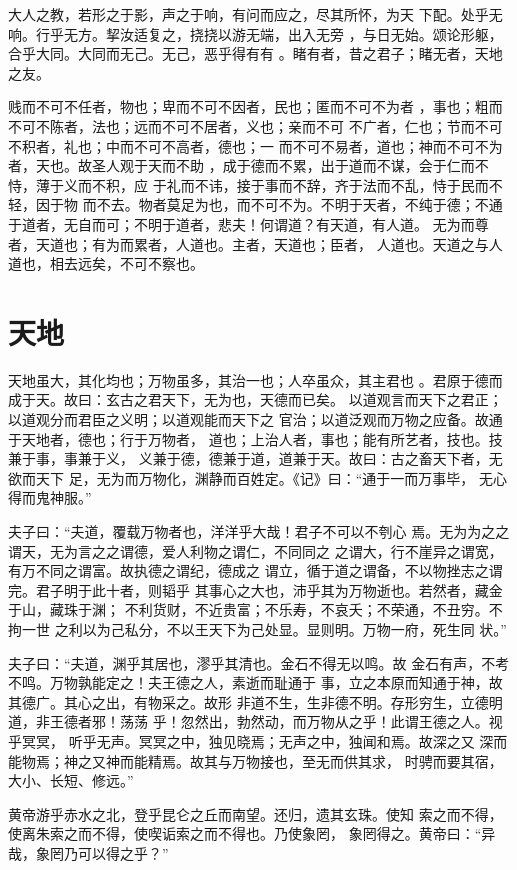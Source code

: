 \documentclass[a4paper,12pt,UTF8,twoside]{ctexbook}
\begin{document}
大人之教，若形之于影，声之于响，有问而应之，尽其所怀，为天 下配。处乎无响。行乎无方。挈汝适复之，挠挠以游无端，出入无旁 ，与日无始。颂论形躯，合乎大同。大同而无己。无己，恶乎得有有 。睹有者，昔之君子；睹无者，天地之友。

贱而不可不任者，物也；卑而不可不因者，民也；匿而不可不为者 ，事也；粗而不可不陈者，法也；远而不可不居者，义也；亲而不可 不广者，仁也；节而不可不积者，礼也；中而不可不高者，德也；一 而不可不易者，道也；神而不可不为者，天也。故圣人观于天而不助 ，成于德而不累，出于道而不谋，会于仁而不恃，薄于义而不积，应 于礼而不讳，接于事而不辞，齐于法而不乱，恃于民而不轻，因于物 而不去。物者莫足为也，而不可不为。不明于天者，不纯于德；不通 于道者，无自而可；不明于道者，悲夫！何谓道？有天道，有人道。 无为而尊者，天道也；有为而累者，人道也。主者，天道也；臣者， 人道也。天道之与人道也，相去远矣，不可不察也。

\section{天地}

天地虽大，其化均也；万物虽多，其治一也；人卒虽众，其主君也 。君原于德而成于天。故曰：玄古之君天下，无为也，天德而已矣。 以道观言而天下之君正；以道观分而君臣之义明；以道观能而天下之 官治；以道泛观而万物之应备。故通于天地者，德也；行于万物者， 道也；上治人者，事也；能有所艺者，技也。技兼于事，事兼于义， 义兼于德，德兼于道，道兼于天。故曰：古之畜天下者，无欲而天下 足，无为而万物化，渊静而百姓定。《记》曰：“通于一而万事毕， 无心得而鬼神服。”

夫子曰：“夫道，覆载万物者也，洋洋乎大哉！君子不可以不刳心 焉。无为为之之谓天，无为言之之谓德，爱人利物之谓仁，不同同之 之谓大，行不崖异之谓宽，有万不同之谓富。故执德之谓纪，德成之 谓立，循于道之谓备，不以物挫志之谓完。君子明于此十者，则韬乎 其事心之大也，沛乎其为万物逝也。若然者，藏金于山，藏珠于渊； 不利货财，不近贵富；不乐寿，不哀夭；不荣通，不丑穷。不拘一世 之利以为己私分，不以王天下为己处显。显则明。万物一府，死生同 状。”

夫子曰：“夫道，渊乎其居也，漻乎其清也。金石不得无以鸣。故 金石有声，不考不鸣。万物孰能定之！夫王德之人，素逝而耻通于 事，立之本原而知通于神，故其德广。其心之出，有物采之。故形 非道不生，生非德不明。存形穷生，立德明道，非王德者邪！荡荡 乎！忽然出，勃然动，而万物从之乎！此谓王德之人。视乎冥冥， 听乎无声。冥冥之中，独见晓焉；无声之中，独闻和焉。故深之又 深而能物焉；神之又神而能精焉。故其与万物接也，至无而供其求， 时骋而要其宿，大小、长短、修远。”

黄帝游乎赤水之北，登乎昆仑之丘而南望。还归，遗其玄珠。使知 索之而不得，使离朱索之而不得，使喫诟索之而不得也。乃使象罔， 象罔得之。黄帝曰：“异哉，象罔乃可以得之乎？”
\end{document}
